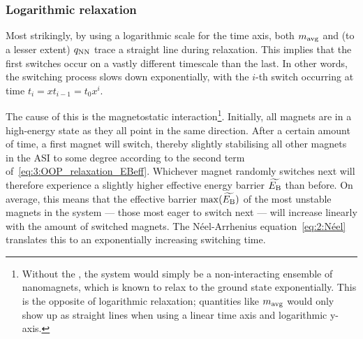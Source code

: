 \subsubsection{Logarithmic relaxation}
Most strikingly, by using a logarithmic scale for the time axis, both $m_\mathrm{avg}$ and (to a lesser extent) $q_\mathrm{NN}$ trace a straight line during relaxation.
This  implies that the first switches occur on a vastly different timescale than the last.
In other words, the switching process slows down exponentially, with the $i$-th switch occurring at time $t_i = x t_{i-1} = t_0 x^i$. \par
The cause of this is the magnetostatic interaction\footnote{
	Without the , the system would simply be a non-interacting ensemble of nanomagnets, which is known to relax to the ground state exponentially.
	This is the opposite of logarithmic relaxation; quantities like $m_\mathrm{avg}$ would only show up as straight lines when using a linear time axis and logarithmic y-axis.
}.
Initially, all magnets are in a high-energy state as they all point in the same direction.
After a certain amount of time, a first magnet will switch, thereby slightly stabilising all other magnets in the ASI to some degree according to the second term of~\cref{eq:3:OOP_relaxation_EBeff}.
Whichever magnet randomly switches next will therefore experience a slightly higher effective energy barrier $\widetilde{E_\mathrm{B}}$ than before.
On average, this means that the effective barrier $\max(\widetilde{E_\mathrm{B}})$ of the most unstable magnets in the system --- those most eager to switch next --- will increase linearly with the amount of switched magnets.
The N\'eel-Arrhenius equation~\eqref{eq:2:Néel} translates this to an exponentially increasing switching time. \\\par

